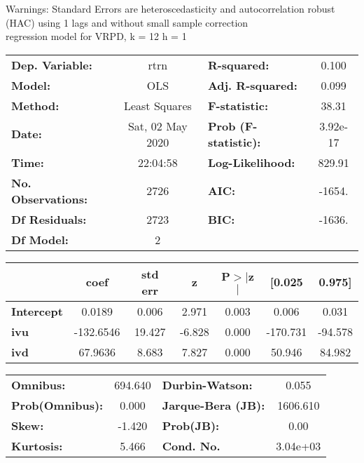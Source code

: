 Warnings: \newline
 [1] Standard Errors are heteroscedasticity and autocorrelation robust (HAC) using 1 lags and without small sample correction\\ 

regression model for VRPD, k = 12 h = 1\begin{center}
\begin{tabular}{lclc}
\toprule
\textbf{Dep. Variable:}    &       rtrn       & \textbf{  R-squared:         } &     0.100   \\
\textbf{Model:}            &       OLS        & \textbf{  Adj. R-squared:    } &     0.099   \\
\textbf{Method:}           &  Least Squares   & \textbf{  F-statistic:       } &     38.31   \\
\textbf{Date:}             & Sat, 02 May 2020 & \textbf{  Prob (F-statistic):} &  3.92e-17   \\
\textbf{Time:}             &     22:04:58     & \textbf{  Log-Likelihood:    } &    829.91   \\
\textbf{No. Observations:} &        2726      & \textbf{  AIC:               } &    -1654.   \\
\textbf{Df Residuals:}     &        2723      & \textbf{  BIC:               } &    -1636.   \\
\textbf{Df Model:}         &           2      & \textbf{                     } &             \\
\bottomrule
\end{tabular}
\begin{tabular}{lcccccc}
                   & \textbf{coef} & \textbf{std err} & \textbf{z} & \textbf{P$> |$z$|$} & \textbf{[0.025} & \textbf{0.975]}  \\
\midrule
\textbf{Intercept} &       0.0189  &        0.006     &     2.971  &         0.003        &        0.006    &        0.031     \\
\textbf{ivu}       &    -132.6546  &       19.427     &    -6.828  &         0.000        &     -170.731    &      -94.578     \\
\textbf{ivd}       &      67.9636  &        8.683     &     7.827  &         0.000        &       50.946    &       84.982     \\
\bottomrule
\end{tabular}
\begin{tabular}{lclc}
\textbf{Omnibus:}       & 694.640 & \textbf{  Durbin-Watson:     } &    0.055  \\
\textbf{Prob(Omnibus):} &   0.000 & \textbf{  Jarque-Bera (JB):  } & 1606.610  \\
\textbf{Skew:}          &  -1.420 & \textbf{  Prob(JB):          } &     0.00  \\
\textbf{Kurtosis:}      &   5.466 & \textbf{  Cond. No.          } & 3.04e+03  \\
\bottomrule
\end{tabular}
\end{center}


